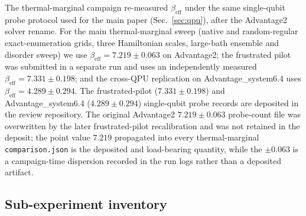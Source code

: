 \documentclass[aps,prapplied,reprint,superscriptaddress,floatfix,nofootinbib]{revtex4-2}
\begin{document}
The thermal-marginal campaign re-measured $\beta_\mathrm{eff}$ under the same
single-qubit probe protocol used for the main paper (Sec.~\ref{sec:qpu}),
after the Advantage2 solver rename.  For the main thermal-marginal sweep
(native and random-regular exact-enumeration grids, three Hamiltonian scales,
large-bath ensemble and disorder sweep) we use
$\beta_\mathrm{eff}=7.219\pm 0.063$ on Advantage2; the frustrated pilot
was submitted in a separate run and uses an independently measured
$\beta_\mathrm{eff}=7.331\pm 0.198$; and the cross-QPU replication on
Advantage\_system6.4 uses
$\beta_\mathrm{eff}=4.289\pm 0.294$.  The frustrated-pilot
($7.331\pm 0.198$) and Advantage\_system6.4 ($4.289\pm 0.294$)
single-qubit probe records are deposited in the review repository.  The
original Advantage2 $7.219\pm 0.063$ probe-count file was overwritten by
the later frustrated-pilot recalibration and was not retained in the
deposit; the point value $7.219$ propagated into every thermal-marginal
\texttt{comparison.json} is the deposited and load-bearing quantity,
while the $\pm 0.063$ is a campaign-time dispersion recorded in the run
logs rather than a deposited artifact.

\subsection{Sub-experiment inventory}
\label{sec:phase6_inventory}
\end{document}
